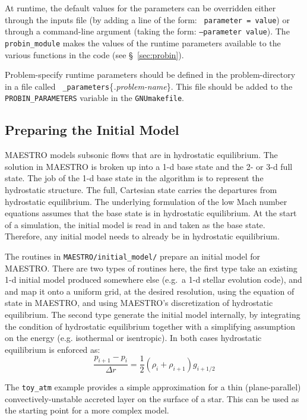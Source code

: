 At runtime, the default values for the parameters can be overridden
either through the inputs file (by adding a line of the form: {\tt
  parameter = value}) or through a command-line argument (taking the
form: {\tt --parameter value}).  The {\tt probin\_module} makes the
values of the runtime parameters available to the various functions
in the code (see \S~\ref{sec:probin}).

Problem-specify runtime parameters should be defined in the
problem-directory in a file called {\tt
  \_parameters}\{{\em.problem-name}\}.  This file should be added
to the {\tt PROBIN\_PARAMETERS} variable in the {\tt GNUmakefile}.



\subsection{Preparing the Initial Model}

\label{sec:initial_models}

MAESTRO models subsonic flows that are in hydrostatic equilibrium.
The solution in MAESTRO is broken up into a 1-d base state and the 2-
or 3-d full state.  The job of the 1-d base state in the algorithm is
to represent the hydrostatic structure.  The full, Cartesian state
carries the departures from hydrostatic equilibrium.  The underlying
formulation of the low Mach number equations assumes that the base
state is in hydrostatic equilibrium.  At the start of a simulation,
the initial model is read in and taken as the base state.  Therefore,
any initial model needs to already be in hydrostatic equilibrium.

The routines in {\tt MAESTRO/initial\_model/} prepare an initial model
for MAESTRO.  There are two types of routines here, the first type
take an existing 1-d initial model produced somewhere else (e.g.\ a
1-d stellar evolution code), and and map it onto a uniform grid, at
the desired resolution, using the equation of state in MAESTRO, and
using MAESTRO's discretization of hydrostatic equilibrium.  The second
type generate the initial model internally, by integrating the
condition of hydrostatic equilibrium together with a simplifying
assumption on the energy (e.g. isothermal or isentropic).  In
both cases hydrostatic equilibrium is enforced as:
\begin{equation}
\frac{p_{i+1} - p_i}{\Delta r} = \frac{1}{2} (\rho_i + \rho_{i+1})
g_{i+1/2}
\end{equation}

The {\tt toy\_atm} example provides a simple approximation for a thin
(plane-parallel) convectively-unstable accreted layer on the surface
of a star.  This can be used as the starting point for a more complex
model.  

